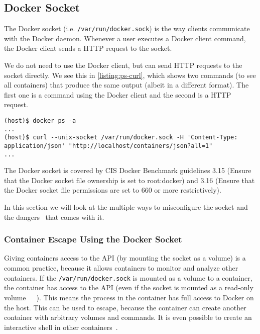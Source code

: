 \subsection{Docker Socket}\label{subsection:api}
The Docker socket (i.e. \lstinline{/var/run/docker.sock}) is the way clients communicate with the Docker daemon. Whenever a user executes a Docker client command, the Docker client sends a HTTP request to the socket.

We do not need to use the Docker client, but can send HTTP requests to the socket directly. We see this in \autoref{listing:ps-curl}, which shows two commands (to see all containers) that produce the same output (albeit in a different format). The first one is a command using the Docker client and the second is a HTTP request.
\begin{lstlisting}[caption={Interaction with the Docker daemon with the Docker client and the socket directly.},captionpos=b, label={listing:ps-curl}]
(host)$ docker ps -a
...
(host)$ curl --unix-socket /var/run/docker.sock -H 'Content-Type: application/json' "http://localhost/containers/json?all=1"
...
\end{lstlisting}

\medskip

The Docker socket is covered by CIS Docker Benchmark guidelines 3.15 (Ensure that the Docker socket file ownership is set to root:docker) and 3.16 (Ensure that the Docker socket file permissions are set to 660 or more restrictively).

\medskip

In this section we will look at the multiple ways to misconfigure the socket and the dangers~\cite{The-Dangers-Of-Docker-Sock} that comes with it.

\subsubsection{Container Escape Using the Docker Socket}
Giving containers access to the API (by mounting the socket as a volume) is a common practice, because it allows containers to monitor and analyze other containers. If the \lstinline{/var/run/docker.sock} is mounted as a volume to a container, the container has access to the API (even if the socket is mounted as a read-only volume~\cite{The-Dangers-Of-Docker-Sock}~\cite{Read-Only-Docker-Socket-Tweet}~\cite{Read-Only-Docker-Socket-Hackernews}). This means the process in the container has full access to Docker on the host. This can be used to escape, because the container can create another container with arbitrary volumes and commands. It is even possible to create an interactive shell in other containers~\cite{Escape-Socket-Shell}.

